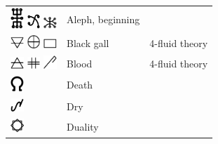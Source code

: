 \documentclass[british,final,landscape]{scrartcl}
\begin{document}
\begin{refsection}
\begin{supertabular}{p{0.3\textwidth}p{0.34\textwidth}p{0.34\textwidth}}
  \includegraphics[width=5mm]{Concepts/Beginning} \includegraphics[width=5mm]{Concepts/Beginning2} \includegraphics[width=5mm]{Concepts/Beginning3} & Aleph, beginning & \\
  \includegraphics[width=5mm]{Concepts/BlackGall} \includegraphics[width=5mm]{Concepts/BlackGall2} \includegraphics[width=5mm]{Concepts/BlackGall3} & Black gall & 4-fluid theory \\
  \includegraphics[width=5mm]{Concepts/Blood} \includegraphics[width=5mm]{Concepts/Blood2} \includegraphics[width=5mm]{Concepts/Blood3} & Blood & 4-fluid theory \\
  \includegraphics[width=5mm]{Concepts/Death} & Death & \\
  \includegraphics[width=5mm]{Concepts/Dry} & Dry & \\
  \includegraphics[width=5mm]{Concepts/Duality} & Duality & \\

\end{supertabular}
\end{refsection}
\end{document}
